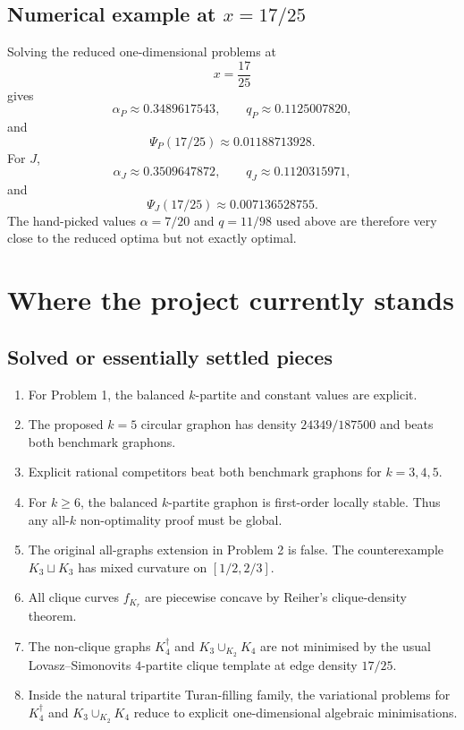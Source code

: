 \documentclass[11pt]{amsart}
\theoremstyle{definition}
\newcommand{\1}{\mathbf 1}
\begin{document}
\subsection{Numerical example at $x=17/25$}

Solving the reduced one-dimensional problems at
\[
   x=\frac{17}{25}
\]
gives
\[
   \alpha_P\approx 0.3489617543,
   \qquad q_P\approx 0.1125007820,
\]
and
\[
   \Psi_P(17/25)\approx 0.01188713928.
\]
For $J$,
\[
   \alpha_J\approx 0.3509647872,
   \qquad q_J\approx 0.1120315971,
\]
and
\[
   \Psi_J(17/25)\approx 0.007136528755.
\]
The hand-picked values $\alpha=7/20$ and $q=11/98$ used above are therefore very close to the reduced optima but not exactly optimal.

\section{Where the project currently stands}

\subsection{Solved or essentially settled pieces}

\begin{enumerate}[label=(\arabic*)]
\item For Problem 1, the balanced $k$-partite and constant values are explicit.
\item The proposed $k=5$ circular graphon has density $24349/187500$ and beats both benchmark graphons.
\item Explicit rational competitors beat both benchmark graphons for $k=3,4,5$.
\item For $k\ge 6$, the balanced $k$-partite graphon is first-order locally stable.  Thus any all-$k$ non-optimality proof must be global.
\item The original all-graphs extension in Problem 2 is false.  The counterexample $K_3\sqcup K_3$ has mixed curvature on $[1/2,2/3]$.
\item All clique curves $f_{K_r}$ are piecewise concave by Reiher's clique-density theorem.
\item The non-clique graphs $K_4^\dagger$ and $K_3\cup_{K_2}K_4$ are not minimised by the usual Lovasz--Simonovits $4$-partite clique template at edge density $17/25$.
\item Inside the natural tripartite Turan-filling family, the variational problems for $K_4^\dagger$ and $K_3\cup_{K_2}K_4$ reduce to explicit one-dimensional algebraic minimisations.
\end{enumerate}
\end{document}
